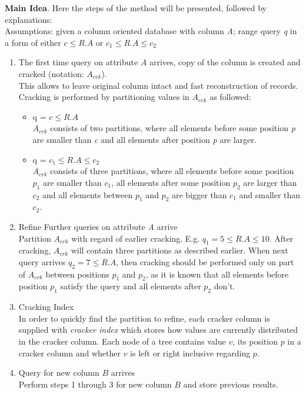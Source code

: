 \documentclass[10pt, conference, compsocconf]{IEEEtran}
\begin{document}
\textbf{Main Idea}. Here the steps of the method will be presented, followed by explanations:\\
Assumptions: given a column oriented database with column \textit{A}; range query \textit{q} in a form of either \textit{$c \leq R.A$} or \textit{$c_1 \leq R.A \leq c_2$}
\begin{enumerate}
\item{The first time query on attribute \textit{A} arrives, copy of the column is created and cracked (notation:  $A_{crk}$}).\\
This allows to leave original column intact and fast reconstruction of records. Cracking is performed by partitioning values in $A_{crk}$ as followed:
\begin{itemize}
\item{q = $c \leq R.A$}\\
$A_{crk}$ consists of two partitions, where all elements before some position \textit{p} are smaller than \textit{c} and all elements after position \textit{p} are larger.
\item{q = $c_1 \leq R.A \leq c_2$}\\
$A_{crk}$ consists of three partitions, where all elements before some position $p_1$ are smaller than \textit{$c_1$}, all elements after some position $p_2$ are larger than $c_2$ and all elements between $p_1$ and $p_2$ are bigger than $c_1$ and smaller than $c_2$.
\end{itemize}
\item{Refine Further queries on attribute \textit{A} arrive}\\
Partition $A_{crk}$ with regard of earlier cracking. E.g. $q_1 = 5 \leq R.A \leq 10$. After cracking, $A_{crk}$ will contain three partitions as described earlier. When next query arrives $q_2 = 7 \leq R.A$, then cracking should be performed only on part of $A_{crk}$ between positions $p_1$ and $p_2$, as it is known that all elements before position $p_1$ satisfy the query and all elements after $p_2$ don't.
\item{Cracking Index}\\
In order to quickly find the partition to refine, each cracker column is supplied with \textit{cracker index} which stores how values are currently distributed in the cracker column. Each node of a tree contains value $v$, its position $p$ in a cracker column and whether $v$ is left or right inclusive regarding $p$.
\item{Query for new column $B$ arrives}\\
Perform steps 1 through 3 for new column $B$ and store previous results.
\end{enumerate}
\end{document}
